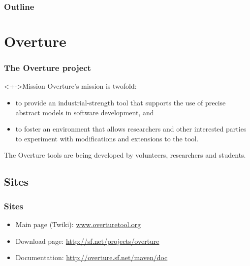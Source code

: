 %
%
\begin{frame}[c]
	\titlepage
\end{frame}

\begin{frame}[c]
  \frametitle{Outline}
  \tableofcontents %
\end{frame}


\section{Overture}
\frame
{
  \frametitle{The Overture project}

\begin{block}<+->{Mission}
	Overture's mission is twofold: 
  \begin{itemize}
  		\item to provide an industrial-strength tool that supports the use of precise abstract models in software development, and 
  		\item to foster an environment that allows researchers and other interested parties to experiment with modifications and extensions to the tool.      

  \end{itemize}
\end{block}

The Overture tools are being developed by volunteers, researchers and students.
}



\subsection{Sites}
\frame
{
  \frametitle{Sites}


\begin{center}
  \begin{itemize}
  		\item Main page (Twiki): \url{www.overturetool.org}
  		\item Download page: \url{http://sf.net/projects/overture}
  		\item Documentation: \url{http://overture.sf.net/maven/doc}
  \end{itemize}
\end{center}
}

